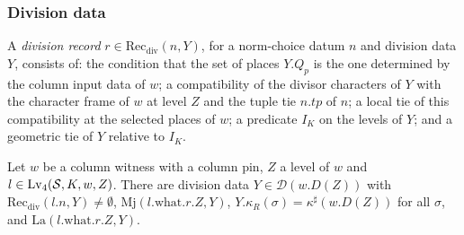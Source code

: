 \subsubsection{Division data}\label{pf:baselat1:sssec:divproofs}

\begin{definition}\label{pf:baselat1:def:divrec}
A \emph{division record} $r\in\mathrm{Rec}_{\mathrm{div}}(n,Y)$, for a norm-choice datum $n$ and division data $Y$,
consists of: the condition that the set of places $Y.Q_p$ is the one determined by the column input data of $w$; a
compatibility of the divisor characters of $Y$ with the character frame of $w$ at level $Z$ and the tuple tie $n.tp$
of $n$; a local tie of this compatibility at the selected places of $w$; a predicate $I_K$ on the levels of
$Y$; and a geometric tie of $Y$ relative to $I_K$.
\end{definition}

\begin{lemma}\label{pf:baselat1:divT}
Let $w$ be a column witness with a column pin, $Z$ a level of $w$ and $l\in\mathrm{Lv}_4(\mathcal S,K,w,Z)$. There
are division data $Y\in\mathcal D(w.D(Z))$ with $\mathrm{Rec}_{\mathrm{div}}(l.n,Y)\ne\emptyset$,
$\mathrm{Mj}(l.\mathrm{what}.r.Z,Y)$, $Y.\kappa_R(\sigma)=\kappa^\sharp(w.D(Z))$ for all $\sigma$, and
$\mathrm{La}(l.\mathrm{what}.r.Z,Y)$.
\end{lemma}

